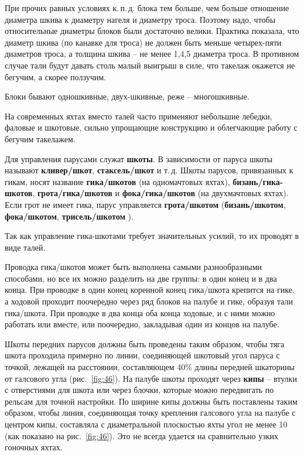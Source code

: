 \documentclass[a4paper, 12pt, twoside, final]{scrbook}
\begin{document}
При прочих равных условиях к.\,п.\,д. блока тем больше, чем больше отношение
диаметра шкива к диаметру нагеля и диаметру троса. Поэтому надо, чтобы
относительные диаметры блоков были достаточно велики. Практика показала,
что диаметр шкива (по канавке для троса) не должен быть меньше четырех-пяти
диаметров троса, а толщина шкива \--- не менее 1,4,5 диаметра троса.
В противном случае тали будут давать столь малый выигрыш в силе, что
такелаж окажется не бегучим, а скорее ползучим.

Блоки бывают одношкивные, двух-шкивные, реже \--- многошкивные.

На современных яхтах вместо талей часто применяют небольшие лебедки,
фаловые и шкотовые, сильно упрощающие конструкцию и облегчающие работу
с бегучим такелажем.


Для управления парусами служат \textbf{шкоты}. В зависимости от паруса
шкоты называют \textbf{кливер\-/шкот}, \textbf{стаксель\-/шкот} и т.\,д.
Шкоты парусов, привязанных к гикам, носят название \textbf{гика\-/шкотов}
(на одномачтовых яхтах), \textbf{бизань\-/гика-шкотов}, \textbf{грота\-/гика\-/шкотов}
и \textbf{фока\-/гика\-/шкотов} (на двухмачтовых яхтах). Если грот не
имеет гика, парус управляется \textbf{грота\-/шкотом} (\textbf{бизань\-/шкотом},
\textbf{фока\-/шкотом}, \textbf{трисель\-/шкотом} ).

Так как управление гика-шкотами требует значительных усилий, то их
проводят в виде талей.

Проводка гика\-/шкотов может быть выполнена самыми разнообразными способами,
но все их можно разделить на две группы: в один конец и в два конца.
При проводке в один конец коренной конец гика\-/шкота крепится на гике,
а ходовой проходит поочередно через ряд блоков на палубе и гике, образуя
тали гика\-/шкота. При проводке в два конца оба конца ходовые, и с ними
можно работать или вместе, или поочередно, закладывая один из концов
на палубе.

Шкоты передних парусов должны быть проведены таким образом, чтобы
тяга шкота проходила примерно по линии, соединяющей шкотовый угол
паруса с точкой, лежащей на расстоянии, составляющем 40\% длины передней
шкаторины от галсового угла (рис.~\ref{fig:46}).
На палубе шкоты проходят через \textbf{кипы} \--- втулки с отверстиями
для шкота или через блочки, которые можно передвигать по рельсам для
точной настройки. По ширине кипы должны быть поставлены таким образом,
чтобы линия, соединяющая точку крепления галсового угла на палубе
с центром кипы, составляла с диаметральной плоскостью яхты угол не
менее 10 (как показано на рис.~\ref{fig:46}).
Это не всегда удается на сравнительно узких гоночных яхтах.
\end{document}
